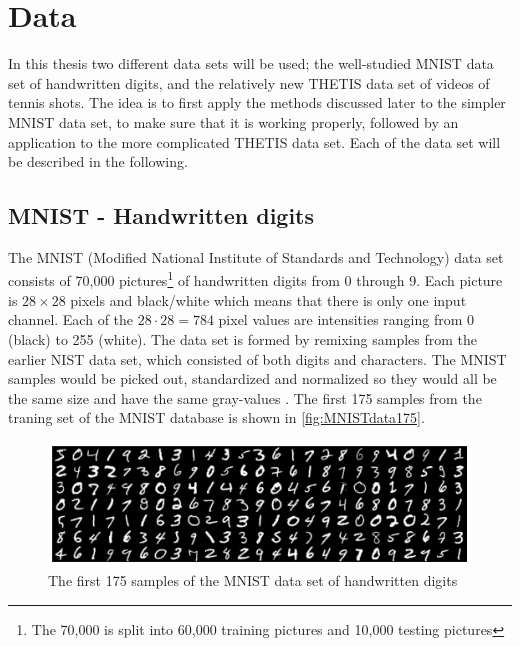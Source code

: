 \section{Data}

In this thesis two different data sets will be used; the well-studied MNIST data set \cite{MNIST} of handwritten digits, and the relatively new THETIS data set \cite{Gourgari2013} of videos of tennis shots. The idea is to first apply the methods discussed later to the simpler MNIST data set, to make sure that it is working properly, followed by an application to the more complicated THETIS data set. Each of the data set will be described in the following. 

\subsection{MNIST - Handwritten digits}
The MNIST (Modified National Institute of Standards and Technology) data set \cite{MNIST} consists of 70,000 pictures\footnote{The 70,000 is split into 60,000 training pictures and 10,000 testing pictures} of handwritten digits from 0 through 9. Each picture is $28\times 28$ pixels and black/white which means that there is only one input channel. Each of the $28\cdot 28 = 784$ pixel values are intensities ranging from 0 (black) to 255 (white). The data set is formed by remixing samples from the earlier NIST data set, which consisted of both digits and characters. The MNIST samples would be picked out, standardized and normalized so they would all be the same size and have the same gray-values \cite{mnistdatabase}. The first 175 samples from the traning set of the MNIST database is shown in \autoref{fig:MNISTdata175}. 

\begin{figure}[H]
    \centering
    \includegraphics[width=\linewidth]{Pics/04_Data/MNIST.png}
    \caption{The first 175 samples of the MNIST data set of handwritten digits}
    \label{fig:MNISTdata175}
\end{figure}

